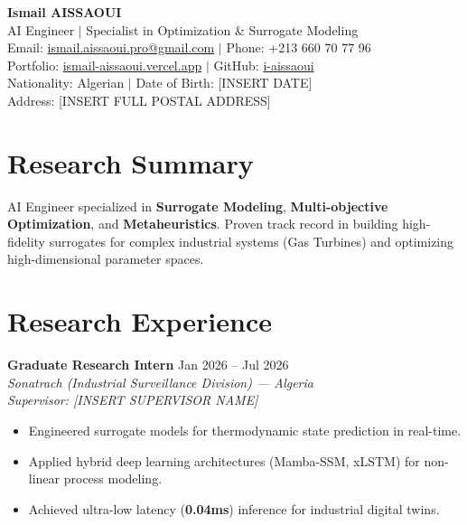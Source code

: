 \documentclass[a4paper,11pt]{article}
\begin{document}
\newpage

\begin{center}
    {\Huge\bfseries\color{loriagold} Ismail AISSAOUI}\\[4pt]
    {\large AI Engineer $|$ Specialist in Optimization \& Surrogate Modeling}\\[6pt]
    \normalsize
    Email: \href{mailto:ismail.aissaoui.pro@gmail.com}{ismail.aissaoui.pro@gmail.com} $|$ Phone: +213 660 70 77 96 \\
    Portfolio: \href{https://ismail-aissaoui.vercel.app}{ismail-aissaoui.vercel.app} $|$ GitHub: \href{https://github.com/i-aissaoui}{i-aissaoui} \\
    Nationality: Algerian $|$ Date of Birth: [INSERT DATE] \\
    Address: [INSERT FULL POSTAL ADDRESS]
\end{center}

\section{Research Summary}
AI Engineer specialized in \textbf{Surrogate Modeling}, \textbf{Multi-objective Optimization}, and \textbf{Metaheuristics}. Proven track record in building high-fidelity surrogates for complex industrial systems (Gas Turbines) and optimizing high-dimensional parameter spaces.

\section{Research Experience}
\textbf{Graduate Research Intern} \hfill Jan 2026 -- Jul 2026 \\
\textit{Sonatrach (Industrial Surveillance Division) — Algeria} \\
\textit{Supervisor: [INSERT SUPERVISOR NAME]}
\begin{itemize}
    \item Engineered surrogate models for thermodynamic state prediction in real-time.
    \item Applied hybrid deep learning architectures (Mamba-SSM, xLSTM) for non-linear process modeling.
    \item Achieved ultra-low latency (\textbf{0.04ms}) inference for industrial digital twins.
\end{itemize}
\end{document}
